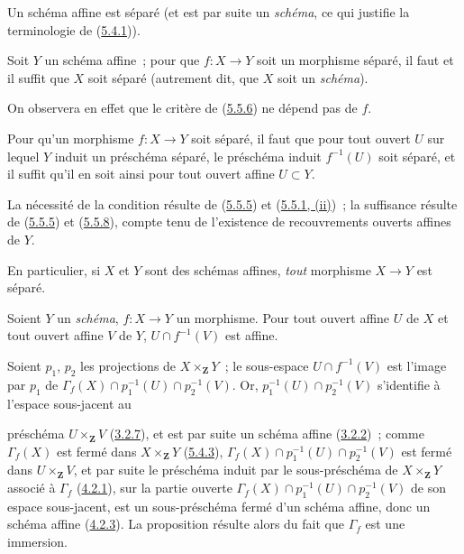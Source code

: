 \begin{corollary}[5.5.7]
\label{I.5.5.7-fr}
Un schéma affine est séparé \textup{(et est par suite un \emph{schéma}, ce qui justifie la
terminologie de (\hyperref[I.5.4.1-fr]{5.4.1}))}.
\end{corollary}

\begin{corollary}[5.5.8]
\label{I.5.5.8-fr}
Soit $Y$ un schéma affine~; pour que $f:X\to Y$ soit un morphisme séparé, il
faut et il suffit que $X$ soit séparé \textup{(autrement dit, que $X$ soit un \emph{schéma})}.
\end{corollary}

On observera en effet que le critère de
(\hyperref[I.5.5.6-fr]{5.5.6}) ne dépend pas de $f$.

\begin{corollary}[5.5.9]
\label{I.5.5.9-fr}
Pour qu'un morphisme $f:X\to Y$ soit séparé, il faut que pour tout ouvert $U$
sur lequel $Y$ induit un préschéma séparé, le préschéma induit $f^{-1}(U)$
soit séparé, et il suffit qu'il en soit ainsi pour tout ouvert affine
$U\subset Y$.
\end{corollary}

La nécessité de la condition résulte de
(\hyperref[I.5.5.5-fr]{5.5.5}) et
(\hyperref[I.5.5.1-fr]{5.5.1, (ii)})~; la suffisance résulte de
(\hyperref[I.5.5.5-fr]{5.5.5}) et
(\hyperref[I.5.5.8-fr]{5.5.8}), compte tenu de l'existence de recouvrements
ouverts affines de $Y$.

En particulier, si $X$ et $Y$ sont des schémas affines, \emph{tout} morphisme
$X\to Y$ est séparé.

\begin{proposition}[5.5.10]
\label{I.5.5.10-fr}
Soient $Y$ un \emph{schéma}, $f:X\to Y$ un morphisme. Pour tout ouvert affine $U$ de
$X$ et tout ouvert affine $V$ de $Y$, $U\cap f^{-1}(V)$ est affine.
\end{proposition}

Soient $p_1$, $p_2$ les projections de $X\times_{\mathbf{Z}}Y$~; le
sous-espace $U\cap f^{-1}(V)$ est l'image par $p_1$ de
$\Gamma_f(X)\cap p_1^{-1}(U)\cap p_2^{-1}(V)$. Or,
$p_1^{-1}(U)\cap p_2^{-1}(V)$ s'identifie à l'espace sous-jacent au

préschéma $U\times_{\mathbf{Z}}V$
(\hyperref[I.3.2.7-fr]{3.2.7}), et est par suite un schéma affine
(\hyperref[I.3.2.2-fr]{3.2.2})~; comme $\Gamma_f(X)$ est fermé dans
$X\times_{\mathbf{Z}}Y$ (\hyperref[I.5.4.3-fr]{5.4.3}),
$\Gamma_f(X)\cap p_1^{-1}(U)\cap p_2^{-1}(V)$ est fermé dans
$U\times_{\mathbf{Z}}V$, et par suite le préschéma induit par le
sous-préschéma de $X\times_{\mathbf{Z}}Y$ associé à $\Gamma_f$
(\hyperref[I.4.2.1-fr]{4.2.1}), sur la partie ouverte
$\Gamma_f(X)\cap p_1^{-1}(U)\cap p_2^{-1}(V)$ de son espace sous-jacent, est
un sous-préschéma fermé d'un schéma affine, donc un schéma affine
(\hyperref[I.4.2.3-fr]{4.2.3}). La proposition résulte alors du fait que
$\Gamma_f$ est une immersion.

